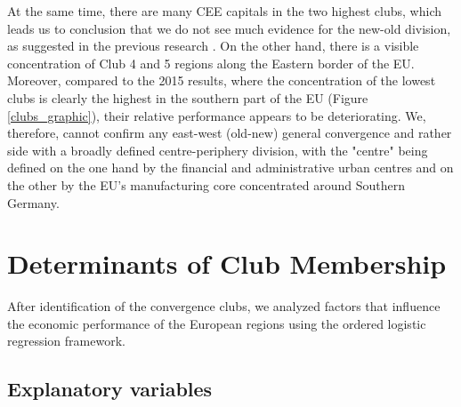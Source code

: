 \documentclass[11pt]{article}
\begin{document}
At the same time, there are many CEE capitals in the two highest clubs, which leads us to conclusion that we do not see much evidence for the new-old division, as suggested in the previous research \citep{eckey2007convergence}.
On the other hand, there is a visible concentration of Club 4 and 5 regions along the Eastern border of the EU. Moreover, compared to the 2015 results, where the concentration of the lowest clubs is clearly the highest in the southern part of the EU (Figure \ref{clubs_graphic}), their relative performance appears to be deteriorating. We, therefore, cannot confirm any east-west (old-new) general convergence and rather side with a broadly defined centre-periphery division, with the "centre" being defined on the one hand by the financial and administrative urban centres and on the other by the EU's manufacturing core concentrated around Southern Germany.


\newpage
\section{Determinants of Club Membership}
\label{Determinants of club membership}


 
After identification of the convergence clubs, we analyzed factors that influence the economic performance of the European regions using the ordered logistic regression framework.

\subsection{Explanatory variables}
\end{document}
